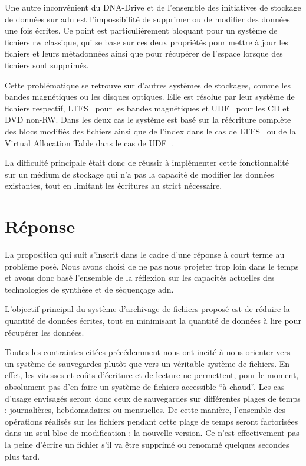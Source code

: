 \documentclass[a4paper]{report}
\makeatletter
\newcommand{\ltfs}{LTFS~\cite{pease2010linear}\@\xspace}
\newcommand{\udf}{UDF~\cite{optical2003universal}\@\xspace}
\makeatother
\begin{document}
Une autre inconvénient du DNA-Drive et de l'ensemble des initiatives
de stockage de données sur \ac{adn} est l'impossibilité de supprimer
ou de modifier des données une fois écrites.
Ce point est particulièrement bloquant pour un système de fichiers \ac{rw} classique,
qui se base sur ces deux propriétés pour mettre à jour les fichiers et leurs métadonnées
ainsi que pour récupérer de l'espace lorsque des fichiers sont supprimés.

Cette problématique se retrouve sur d'autres systèmes de stockages,
comme les bandes magnétiques ou les disques optiques.
Elle est résolue par leur système de fichiers respectif,
\ltfs pour les bandes magnétiques et \udf pour les CD et DVD non-RW.
Dans les deux cas le système est basé sur la réécriture complète des blocs modifiés des fichiers
ainsi que de l'index dans le cas de \ltfs ou de la Virtual Allocation Table dans le cas de \udf.

La difficulté principale était donc de réussir à implémenter cette fonctionnalité
sur un médium de stockage qui n'a pas la capacité de modifier les données existantes,
tout en limitant les écritures au strict nécessaire.


\section{Réponse}

La proposition qui suit s'inscrit dans le cadre d'une réponse à court terme au problème posé.
Nous avons choisi de ne pas nous projeter trop loin dans le temps
et avons donc basé l'ensemble de la réflexion sur les capacités actuelles
des technologies de synthèse et de séquençage \ac{adn}.

L'objectif principal du système d'archivage de fichiers proposé
est de réduire la quantité de données écrites,
tout en minimisant la quantité de données à lire pour récupérer les données.

Toutes les contraintes citées précédemment nous ont incité
à nous orienter vers un système de sauvegardes plutôt que vers un véritable système de fichiers.
En effet, les vitesses et coûts d'écriture et de lecture ne permettent, pour le moment,
absolument pas d'en faire un système de fichiers accessible ``à chaud''.
Les cas d'usage envisagés seront donc ceux de sauvegardes sur différentes plages de temps :
journalières, hebdomadaires ou mensuelles.
De cette manière, l'ensemble des opérations réalisés sur les fichiers pendant cette plage de temps
seront factorisées dans un seul bloc de modification : la nouvelle version.
Ce n'est effectivement pas la peine d'écrire un fichier
s'il va être supprimé ou renommé quelques secondes plus tard.
\end{document}

